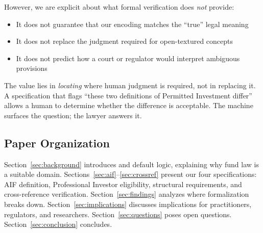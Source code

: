 However, we are explicit about what formal verification does \textit{not} provide:

\begin{itemize}[nosep,leftmargin=1.5em]
  \item It does not guarantee that our encoding matches the ``true'' legal meaning
  \item It does not replace the judgment required for open-textured concepts
  \item It does not predict how a court or regulator would interpret ambiguous provisions
\end{itemize}

The value lies in \textit{locating} where human judgment is required, not in replacing it. A specification that flags ``these two definitions of Permitted Investment differ'' allows a human to determine whether the difference is acceptable. The machine surfaces the question; the lawyer answers it.

\subsection{Paper Organization}

Section~\ref{sec:background} introduces \catala{} and default logic, explaining why fund law is a suitable domain. Sections~\ref{sec:aif}--\ref{sec:crossref} present our four specifications: AIF definition, Professional Investor eligibility, \raif{} structural requirements, and cross-reference verification. Section~\ref{sec:findings} analyzes where formalization breaks down. Section~\ref{sec:implications} discusses implications for practitioners, regulators, and researchers. Section~\ref{sec:questions} poses open questions. Section~\ref{sec:conclusion} concludes.
